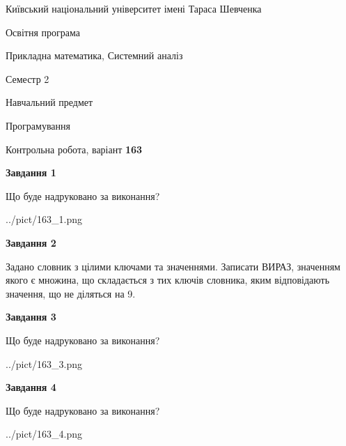 \documentclass[12pt, ukrainian]{article}
\begin{document}
{{\begin {small}\par
{ \center  Київський національний університет імені Тараса Шевченка \par}
{\parbox {5 cm}{Освітня програма \hfill}{\parbox {8 cm}{Прикладна математика, Системний аналіз \hfill}}\parbox {5 cm}{\hfill Семестр 2}}\par
{\parbox {5 cm} {Навчальний предмет \hfill}\parbox {7 cm}{Програмування \hfill}\parbox {6cm}{\hfill}\par}\vspace{-7pt} \end{small}}{\center Контрольна робота, варіант  \No \textbf
{ 163 }\par}}
{
\begin {large}
{\begin {center}\textbf{Завдання 1}\end {center}}\par
Що буде надруковано за виконання?\par\par
\begin{center}
	{../pict/163_1.png}
\end{center}
\newpage

{\begin {center}\textbf{Завдання 2}\end {center}}\par
Задано словник  з цілими ключами та значеннями. Записати ВИРАЗ, значенням якого є множина, що складається  з тих ключів словника, яким відповідають значення, що не діляться на 9.\par
\newpage

{\begin {center}\textbf{Завдання 3}\end {center}}\par
Що буде надруковано за виконання?\par
\begin{center}
	{../pict/163_3.png}
\end{center}
\newpage

{\begin {center}\textbf{Завдання 4}\end {center}}\par
Що буде надруковано за виконання?\par
\begin{center}
	{../pict/163_4.png}
\end{center}
\newpage


\end{large}}
\end{document}
